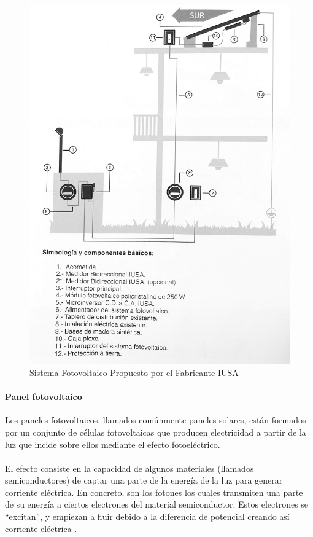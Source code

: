 \begin{figure}[H]
	\centering
	\includegraphics[scale=.1]{Capitulo2/images/sistema-fotovoltaico.jpg}
	\caption{Sistema Fotovoltaico Propuesto por el Fabricante IUSA}
	\label{fig:diagrama_dispensador}
\end{figure}

\paragraph{Panel fotovoltaico}
Los paneles fotovoltaicos, llamados comúnmente paneles solares, están formados por un conjunto de células fotovoltaicas que producen electricidad a partir de la luz que incide sobre ellos mediante el efecto fotoeléctrico.
\paragraph{}
El efecto consiste en la capacidad de algunos materiales (llamados semiconductores) de captar una parte de la energía de la luz para generar corriente eléctrica. En concreto, son los fotones los cuales transmiten una parte de su energía a ciertos electrones del material semiconductor. Estos electrones se “excitan”, y empiezan a fluir debido a la diferencia de potencial creando así corriente eléctrica \citep{MarcoTeorico2}.

